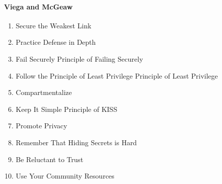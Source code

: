 \paragraph{Viega and McGeaw}
\begin{enumerate}
    \item Secure the Weakest Link
    \item Practice Defense in Depth
    \item Fail Securely \dotfill Principle of Failing Securely
    \item Follow the Principle of Least Privilege \dotfill Principle of Least Privilege
    \item Compartmentalize
    \item Keep It Simple \dotfill Principle of KISS
    \item Promote Privacy
    \item Remember That Hiding Secrets is Hard
    \item Be Reluctant to Trust
    \item Use Your Community Resources
\end{enumerate}
